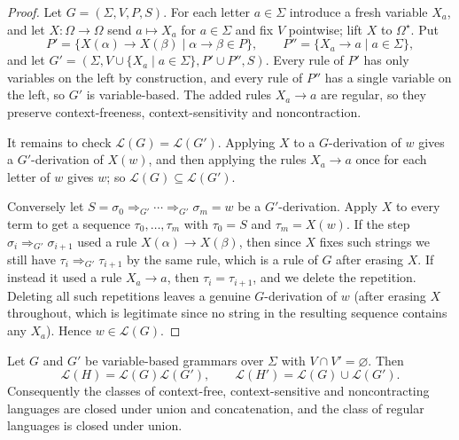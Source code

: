 \documentclass[a4paper]{scrartcl}
\newcommand{\lang}{\mathcal{L}}
\begin{document}
\begin{proof}
	Let $G = (\Sigma, V, P, S)$. For each letter $a \in \Sigma$ introduce a fresh variable $X_a$, and let $X \colon \Omega \to \Omega$ send $a \mapsto X_a$ for $a \in \Sigma$ and fix $V$ pointwise; lift $X$ to $\Omega^\star$. Put
	$$P' = \{X(\alpha) \to X(\beta) \mid \alpha \to \beta \in P\}, \qquad P'' = \{X_a \to a \mid a \in \Sigma\},$$
	and let $G' = (\Sigma, V \cup \{X_a \mid a \in \Sigma\}, P' \cup P'', S)$. Every rule of $P'$ has only variables on the left by construction, and every rule of $P''$ has a single variable on the left, so $G'$ is variable-based. The added rules $X_a \to a$ are regular, so they preserve context-freeness, context-sensitivity and noncontraction.

	It remains to check $\lang(G) = \lang(G')$. Applying $X$ to a $G$-derivation of $w$ gives a $G'$-derivation of $X(w)$, and then applying the rules $X_a \to a$ once for each letter of $w$ gives $w$; so $\lang(G) \subseteq \lang(G')$.

	Conversely let $S = \sigma_0 \Rightarrow_{G'} \cdots \Rightarrow_{G'} \sigma_m = w$ be a $G'$-derivation. Apply $X$ to every term to get a sequence $\tau_0, \dots, \tau_m$ with $\tau_0 = S$ and $\tau_m = X(w)$. If the step $\sigma_i \Rightarrow_{G'} \sigma_{i+1}$ used a rule $X(\alpha) \to X(\beta)$, then since $X$ fixes such strings we still have $\tau_i \Rightarrow_{G'} \tau_{i+1}$ by the same rule, which is a rule of $G$ after erasing $X$. If instead it used a rule $X_a \to a$, then $\tau_i = \tau_{i+1}$, and we delete the repetition. Deleting all such repetitions leaves a genuine $G$-derivation of $w$ (after erasing $X$ throughout, which is legitimate since no string in the resulting sequence contains any $X_a$). Hence $w \in \lang(G)$.
\end{proof}

\begin{theorem}\label{thm:closureunionconcat}
	Let $G$ and $G'$ be variable-based grammars over $\Sigma$ with $V \cap V' = \varnothing$. Then
	$$\lang(H) = \lang(G)\lang(G'), \qquad \lang(H') = \lang(G) \cup \lang(G').$$
	Consequently the classes of context-free, context-sensitive and noncontracting languages are closed under union and concatenation, and the class of regular languages is closed under union.
\end{theorem}
\end{document}
